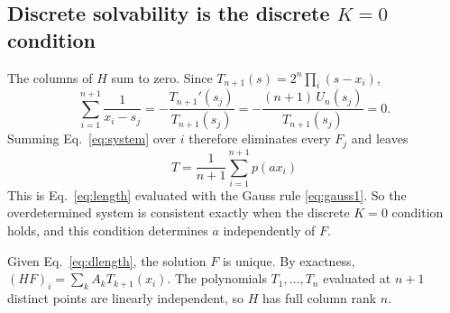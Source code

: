 \documentclass[12pt]{article}
\begin{document}
\subsection{Discrete solvability is the discrete \texorpdfstring{$K=0$}{K=0} condition}
The columns of $H$ sum to zero. Since $T_{n+1}(s) = 2^n\prod_i(s-x_i)$,
\begin{equation*}
	\sum_{i=1}^{n+1}\frac{1}{x_i-s_j} = -\frac{T_{n+1}'(s_j)}{T_{n+1}(s_j)}
	= -\frac{(n+1)\,U_n(s_j)}{T_{n+1}(s_j)} = 0 .
\end{equation*}
Summing Eq.~\eqref{eq:system} over $i$ therefore eliminates every $F_j$ and leaves
\begin{equation}\label{eq:dlength}
	\boxed{\;T = \frac{1}{n+1}\sum_{i=1}^{n+1} p(a x_i)\;}
\end{equation}
This is Eq.~\eqref{eq:length} evaluated with the Gauss rule \eqref{eq:gauss1}. So
the overdetermined system is consistent exactly when the discrete $K=0$
condition holds, and this condition determines $a$ independently of $F$.

Given Eq.~\eqref{eq:dlength}, the solution $F$ is unique. By exactness,
$(HF)_i = \sum_k A_k T_{k+1}(x_i)$. The polynomials $T_1,\dots,T_n$ evaluated at
$n+1$ distinct points are linearly independent, so $H$ has full column rank $n$.
\end{document}
